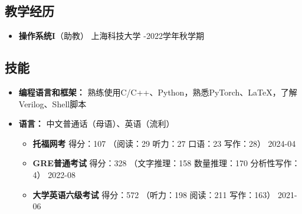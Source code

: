 \documentclass[a4paper,10pt]{ctexart} %
\begin{document}

\begin{keepsection}
\subsection{教学经历}

    \begin{itemize}
        \item \textbf{操作系统I}（助教） \hfill 上海科技大学 -2022学年秋学期
    \end{itemize}
\end{keepsection}



\begin{keepsection}

\section{技能}
\begin{itemize}
    \item \textbf{编程语言和框架：} 熟练使用C/C++、Python，熟悉PyTorch、\LaTeX，了解Verilog、Shell脚本
    \item \textbf{语言：} 中文普通话（母语）、英语（流利）
        \begin{itemize}
            \item \textbf{托福网考} \quad 得分：107 {\small （阅读：29 \quad 听力：27 \quad 口语：23 \quad 写作：28）} \hfill 2024-04
            \item \textbf{GRE普通考试} \quad 得分：328 {\small （文字推理：158 \quad 数量推理：170 \quad 分析性写作：4）} \hfill 2022-08
            \item \textbf{大学英语六级考试} \quad 得分：572 {\small （听力：198 \quad 阅读：211 \quad 写作：163）} \hfill 2021-06
        \end{itemize}
\end{itemize}

\end{keepsection}
\end{document}
